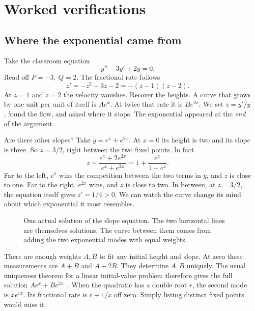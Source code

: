\documentclass[11pt,a4paper]{amsart}
\theoremstyle{definition}
\theoremstyle{remark}
\begin{document}
\section{Worked verifications}
\subsection{Where the exponential came from}
Take the classroom equation
\[
 y''-3y'+2y=0 .
\]
Read off \(P=-3,\ Q=2\). The fractional rate follows
\[
 z'=-z^2+3z-2=-(z-1)(z-2).
\]
At \(z=1\) and \(z=2\) the velocity vanishes. Recover the heights. A curve that grows by one unit per unit of itself is \(Ae^x\). At twice that rate it is \(Be^{2x}\). We set \(z=y'/y\), found the flow, and asked where it stops. The exponential appeared at the \emph{end} of the argument.

Are there other slopes? Take \(y=e^x+e^{2x}\). At \(x=0\) its height is two and its slope is three. So \(z=3/2\), right between the two fixed points. In fact
\[
 z=\frac{e^x+2e^{2x}}{e^x+e^{2x}}
   =1+\frac{e^x}{1+e^x}.
\]
Far to the left, \(e^x\) wins the competition between the two terms in \(y\), and \(z\) is close to one. Far to the right, \(e^{2x}\) wins, and \(z\) is close to two. In between, at \(z=3/2\), the equation itself gives \(z'=1/4>0\). We can watch the curve change its mind about which exponential it most resembles.

\begin{figure}[htbp]
\centering
{}
\caption{One actual solution of the slope equation. The two horizontal lines are themselves solutions. The curve between them comes from adding the two exponential modes with equal weights.}\label{fig:mixed}
\end{figure}

There are enough weights \(A,B\) to fit any initial height and slope. At zero these measurements are \(A+B\) and \(A+2B\). They determine \(A,B\) uniquely. The usual uniqueness theorem for a linear initial-value problem therefore gives the full solution \(Ae^x+Be^{2x}\)~\cite{CodLev1955}. When the quadratic has a double root \(r\), the second mode is \(xe^{rx}\). Its fractional rate is \(r+1/x\) off zero. Simply listing distinct fixed points would miss it.
\end{document}
